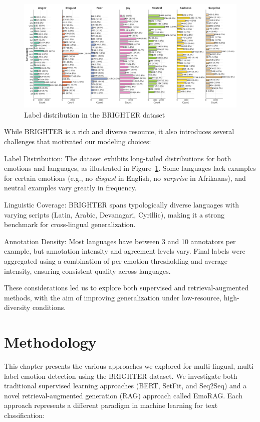 \documentclass[a4paper,12pt]{extarticle}
\begin{document}
\begin{figure}[h]
    \centering
    \includegraphics[width=1\textwidth]{brighter_label_distribution.png}
    \caption{Label distribution in the BRIGHTER dataset}
    \label{fig:brighter_label_distribution}
\end{figure}

While BRIGHTER is a rich and diverse resource, it also introduces several challenges that motivated our modeling choices:

Label Distribution: The dataset exhibits long-tailed distributions for both emotions and languages, as illustrated in Figure~\ref{fig:brighter_label_distribution}. Some languages lack examples for certain emotions (e.g., no \textit{disgust} in English, no \textit{surprise} in Afrikaans), and neutral examples vary greatly in frequency.

Linguistic Coverage: BRIGHTER spans typologically diverse languages with varying scripts (Latin, Arabic, Devanagari, Cyrillic), making it a strong benchmark for cross-lingual generalization.

Annotation Density: Most languages have between 3 and 10 annotators per example, but annotation intensity and agreement levels vary. Final labels were aggregated using a combination of per-emotion thresholding and average intensity, ensuring consistent quality across languages.

These considerations led us to explore both supervised and retrieval-augmented methods, with the aim of improving generalization under low-resource, high-diversity conditions.

\section{Methodology}

This chapter presents the various approaches we explored for multi-lingual, multi-label emotion detection using the BRIGHTER dataset. We investigate both traditional supervised learning approaches (BERT, SetFit, and Seq2Seq) and a novel retrieval-augmented generation (RAG) approach called EmoRAG. Each approach represents a different paradigm in machine learning for text classification:
\end{document}
